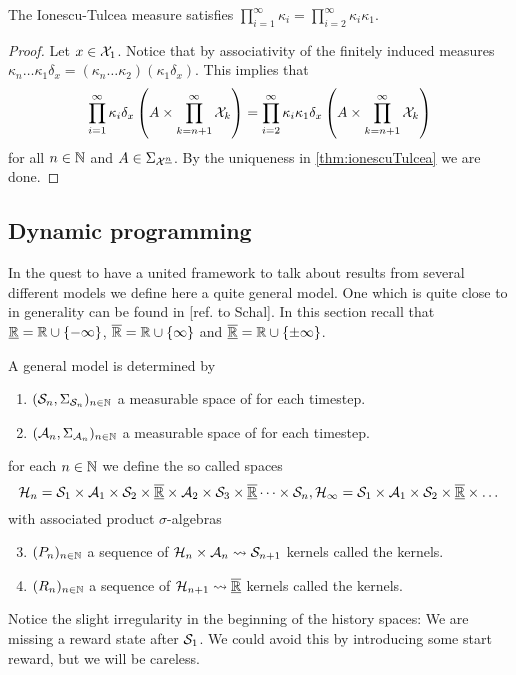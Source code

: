 \documentclass{article}
\begin{document}
\begin{lem}
  The Ionescu-Tulcea measure satisfies
  $\prod_{i=1}^\infty \kappa_i = \prod_{i=2}^\infty \kappa_i \kappa_1 $.
  \label{lem:ionescu}
\end{lem}
\begin{proof}
  Let $x \in \mathcal{X}_1$.
  Notice that by associativity of the finitely induced measures
  $\kappa_n \dots \kappa_1 \delta_x
  = (\kappa_n \dots \kappa_2) (\kappa_1 \delta_x)$.
  This implies that
  \[ \prod_{i=1}^\infty \kappa_i \delta_x
    \left( A \times \prod_{k=n+1}^\infty \mathcal{X}_k \right)
    = \prod_{i=2}^\infty \kappa_i \kappa_1 \delta_x
  \left( A \times \prod_{k=n+1}^\infty \mathcal{X}_k \right) \]
  for all $n \in \mathbb{N}$ and $A \in \Sigma_{\mathcal{X}^{\underline{n}}}$.
  By the uniqueness in \cref{thm:ionescuTulcea} we are done.
\end{proof}

\subsection{Dynamic programming}
In the quest to have a united framework to talk about results from
several different models we define here a quite general model.
One which is quite close to in generality can be found in
[ref. to Schal].
In this section recall that $\underline{\mathbb{R}} = \mathbb{R} \cup \{-\infty\}$,
$\overline{\mathbb{R}} = \mathbb{R} \cup \{\infty\}$ and
$\overline{\underline{\mathbb{R}}} = \mathbb{R} \cup \{\pm \infty\}$.

\begin{defn}[DP model]
  A general  model is determined by
  \begin{enumerate}
    \item $(\mathcal{S}_n, \Sigma_{\mathcal{S}_n})_{n \in \mathbb{N}}$ a 
      measurable space of  for each timestep.
    \item $(\mathcal{A}_n, \Sigma_{\mathcal{A}_n})_{n \in \mathbb{N}}$ a 
      measurable space of  for each timestep.
  \end{enumerate}
  for each $n \in \mathbb{N}$ we define the so called  spaces
  \[ \mathcal{H}_n = \mathcal{S}_1 \times \mathcal{A}_1
    \times \mathcal{S}_2 \times \overline{\underline{\mathbb{R}}} \times \mathcal{A}_2
    \times \mathcal{S}_3 \times \overline{\underline{\mathbb{R}}} \dots \times \mathcal{S}_n,
    \mathcal{H}_\infty = \mathcal{S}_1 \times \mathcal{A}_1 \times \mathcal{S}_2 \times
    \overline{\underline{\mathbb{R}}} \times \dots
  \]
  with associated product $\sigma$-algebras
  \begin{enumerate} \setcounter{enumi}{2}
    \item $(P_n)_{n \in \mathbb{N}}$ a sequence of
      $\mathcal{H}_n \times \mathcal{A}_n \leadsto \mathcal{S}_{n+1}$ kernels
      called the  kernels.
    \item $(R_n)_{n \in \mathbb{N}}$ a sequence of
      $\mathcal{H}_{n+1} \leadsto \overline{\underline{\mathbb{R}}}$ kernels
      called the  kernels.
  \end{enumerate}
\end{defn}
Notice the slight irregularity in the beginning of the history spaces:
We are missing a reward state after $\mathcal{S}_1$. We could avoid
this by introducing some start reward, but we will be careless.
\end{document}

